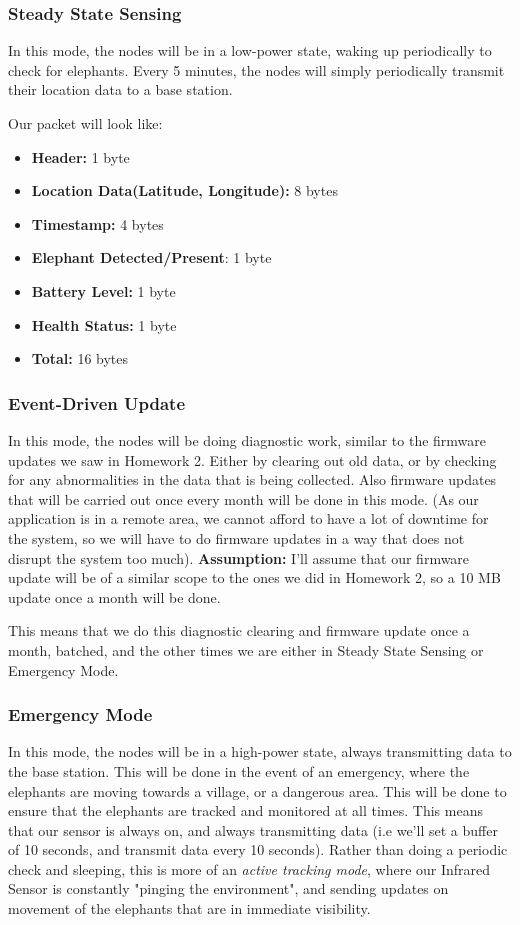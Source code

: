 \subsubsection{Steady State Sensing}
In this mode, the nodes will be in a low-power state, waking up periodically to check for elephants. Every 5 minutes, the nodes will simply periodically transmit their location data to a base station. 

Our packet will look like: 
\begin{itemize}
    \item \textbf{Header:} 1 byte
    \item \textbf{Location Data(Latitude, Longitude):} 8 bytes
    \item \textbf{Timestamp:} 4 bytes
    \item \textbf{Elephant Detected/Present}: 1 byte
    \item \textbf{Battery Level:} 1 byte
    \item \textbf{Health Status:} 1 byte
    \item \textbf{Total:} 16 bytes
\end{itemize}

\subsubsection{Event-Driven Update}
In this mode, the nodes will be doing diagnostic work, similar to the firmware updates we saw in Homework 2. Either by clearing out old data, or by checking for any abnormalities in the data that is being collected. Also firmware updates that will be carried out once every month will be done in this mode. (As our application is in a remote area, we cannot afford to have a lot of downtime for the system, so we will have to do firmware updates in a way that does not disrupt the system too much). \textbf{Assumption: } I'll assume that our firmware update will be of a similar scope to the ones we did in Homework 2, so a 10 MB update once a month will be done. 

This means that we do this diagnostic clearing and firmware update once a month, batched, and the other times we are either in Steady State Sensing or Emergency Mode.

\subsubsection{Emergency Mode}
In this mode, the nodes will be in a high-power state, always transmitting data to the base station. This will be done in the event of an emergency, where the elephants are moving towards a village, or a dangerous area. This will be done to ensure that the elephants are tracked and monitored at all times. This means that our sensor is always on, and always transmitting data (i.e we'll set a buffer of 10 seconds, and transmit data every 10 seconds). Rather than doing a periodic check and sleeping, this is more of an \textit{active tracking mode}, where our Infrared Sensor is constantly "pinging the environment", and sending updates on movement of the elephants that are in immediate visibility.

